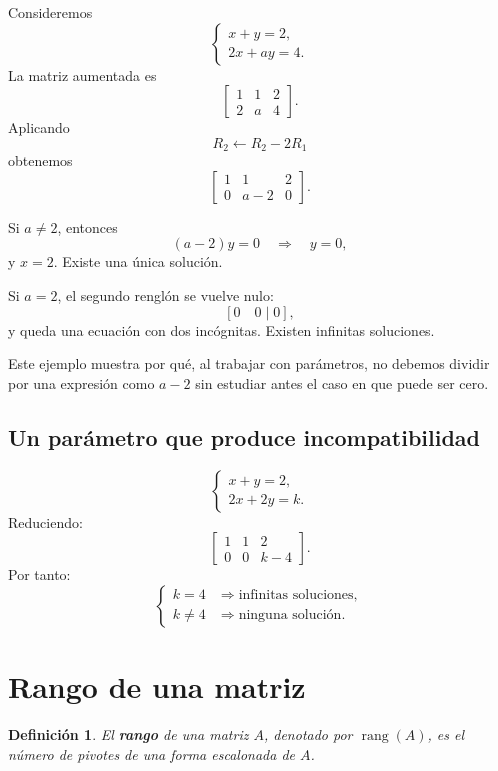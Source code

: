 \documentclass[12pt]{article}
\newtheorem{definicion}{Definición}[section]
\theoremstyle{remark}
\newcommand{\rank}{\operatorname{rang}}
\begin{document}
Consideremos
\[
\begin{cases}
x+y=2,\\
2x+ay=4.
\end{cases}
\]
La matriz aumentada es
\[
\left[
\begin{array}{cc|c}
1&1&2\\
2&a&4
\end{array}
\right].
\]
Aplicando
\[
R_2\leftarrow R_2-2R_1
\]
obtenemos
\[
\left[
\begin{array}{cc|c}
1&1&2\\
0&a-2&0
\end{array}
\right].
\]

Si $a\neq2$, entonces
\[
(a-2)y=0\quad\Longrightarrow\quad y=0,
\]
y $x=2$. Existe una única solución.

Si $a=2$, el segundo renglón se vuelve nulo:
\[
[0\quad0\mid0],
\]
y queda una ecuación con dos incógnitas. Existen infinitas soluciones.

Este ejemplo muestra por qué, al trabajar con parámetros, no debemos dividir por una expresión como
$a-2$ sin estudiar antes el caso en que puede ser cero.

\subsection{Un parámetro que produce incompatibilidad}

\[
\begin{cases}
x+y=2,\\
2x+2y=k.
\end{cases}
\]
Reduciendo:
\[
\left[
\begin{array}{cc|c}
1&1&2\\
0&0&k-4
\end{array}
\right].
\]
Por tanto:
\[
\begin{cases}
k=4 &\Longrightarrow \text{infinitas soluciones},\\
k\neq4 &\Longrightarrow \text{ninguna solución}.
\end{cases}
\]

\section{Rango de una matriz}

\begin{definicion}
El \textbf{rango} de una matriz $A$, denotado por $\rank(A)$, es el número de pivotes de una forma
escalonada de $A$.
\end{definicion}
\end{document}
